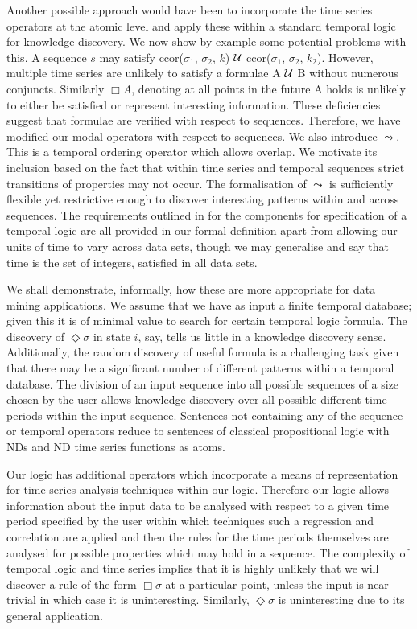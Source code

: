 \medskip

Another possible approach would have been to incorporate the time
series operators at the atomic level and apply these within a standard
temporal logic for knowledge discovery. We now show by example some
potential problems with this. A sequence $s$ may satisfy
ccor($\sigma_1$, $\sigma_2$, $k$) ${\cal U}$ ccor($\sigma_1$,
$\sigma_2$, $k_2$). However, multiple time series are unlikely to
satisfy a formulae A ${\cal U}$ B without numerous conjuncts. Similarly
$\Box A$, denoting at all points in the future A holds is unlikely to
either be satisfied or represent interesting information. These
deficiencies suggest that formulae are verified with respect to
sequences. Therefore, we have modified our modal operators with
respect to sequences. We also introduce $\leadsto$. This is a temporal
ordering operator which allows overlap. We motivate its inclusion
based on the fact that within time series and temporal sequences
strict transitions of properties may not occur. The formalisation of
$\leadsto$ is sufficiently flexible yet restrictive enough to discover
interesting patterns within and across sequences. The requirements
outlined in \cite{ghr94} for the components for specification of a
temporal logic are all provided in our formal definition apart from
allowing our units of time to vary across data sets, though we may
generalise and say that time is the set of integers, satisfied in all
data sets.

\smallskip

We shall demonstrate, informally, how these
are more appropriate for data mining applications. We assume that we
have as input a finite temporal database; given this it is of minimal
value to search for certain temporal logic formula. The discovery of
$\Diamond \sigma$ in state $i$, say, tells us little in a knowledge
discovery sense.  Additionally, the random discovery of useful formula
is a challenging task given that there may be a significant number of
different patterns within a temporal database. The division of an
input sequence into all possible sequences of a size chosen by the
user allows knowledge discovery over all possible different time
periods within the input sequence. Sentences not containing any of the
sequence or temporal operators reduce to sentences of classical
propositional logic with NDs and ND time series functions as atoms.

\medskip

Our logic has additional operators which incorporate a means of
representation for time series analysis techniques within our
logic. Therefore our logic allows information about the input data to
be analysed with respect to a given time period specified by the user
within which techniques such a regression and correlation are applied
and then the rules for the time periods themselves are analysed for
possible properties which may hold in a sequence. The complexity of
temporal logic and time series implies that it is highly unlikely that
we will discover a rule of the form $\Box \sigma$ at a particular
point, unless the input is near trivial in which case it is
uninteresting. Similarly, $\Diamond \sigma$ is uninteresting due to
its general application.

